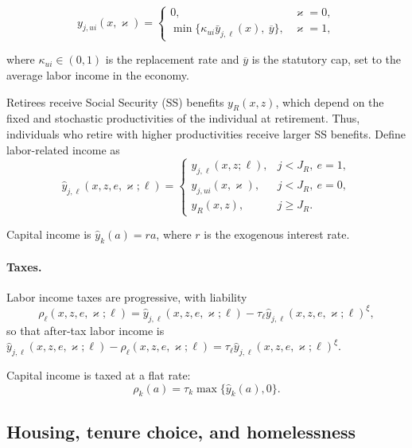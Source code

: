 \documentclass[parskip=full]{article}
\theoremstyle{plain}
\theoremstyle{definition}
\theoremstyle{remark}
\begin{document}
\begin{equation*}
\label{eq:ui_income}
y_{j,ui}(x,\varkappa)=
\begin{cases}
0, & \varkappa=0,\\
\min\{\kappa_{ui}\bar y_{j,\ell}(x),\ \overline{y}\}, & \varkappa=1,
\end{cases}
\end{equation*}

\noindent where $\kappa_{ui}\in(0,1)$ is the replacement rate and $\overline{y}$ is the statutory cap, set to the average labor income in the economy.

Retirees receive Social Security (SS) benefits $y_R(x,z)$, which depend on the fixed and stochastic productivities of the individual at retirement. Thus, individuals who retire with higher productivities receive larger SS benefits. Define labor-related income as
\begin{equation*}\label{eq:hat_y_l}
\hat y_{j,\ell}(x,z,e,\varkappa;\ell)=
\begin{cases}
y_{j,\ell}(x,z;\ell), & j<J_R,\ e=1,\\
y_{j,ui}(x,\varkappa), & j<J_R,\ e=0,\\
y_R(x,z), & j\ge J_R.
\end{cases}
\end{equation*}

Capital income is $\hat y_k(a)= r a$, where $r$ is the exogenous interest rate. 

\paragraph{Taxes.}
Labor income taxes are progressive, with liability
\begin{equation}\label{eq:tax_l}
\rho_{\ell}(x,z,e,\varkappa;\ell)=\hat y_{j,\ell}(x,z,e,\varkappa;\ell)-\tau_\ell \hat y_{j,\ell}(x,z,e,\varkappa;\ell)^{\xi},
\end{equation}
so that after-tax labor income is $\hat y_{j,\ell}(x,z,e,\varkappa;\ell)-\rho_{\ell}(x,z,e,\varkappa;\ell)=\tau_\ell \hat y_{j,\ell}(x,z,e,\varkappa;\ell)^{\xi}$.

Capital income is taxed at a flat rate:
\begin{equation}\label{eq:tax_k}
\rho_k(a)=\tau_k\max\{\hat y_k(a),0\}.
\end{equation}

\subsection{Housing, tenure choice, and homelessness}\label{sec:housing}
\end{document}
